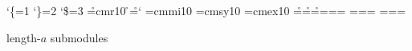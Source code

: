 %
%
%
%
%
%
\catcode`\{=1 \catcode`\}=2 \catcode`\$=3
\font\r=cmr10 \r \hyphenchar\r=`\- \hsize=200pt \parindent=0pt
\font\mi=cmmi10 \font\sy=cmsy10 \font\ex=cmex10
=\r {}=\r {}=\r
{}=\mi {}=\mi {}=\mi
{}=\sy {}=\sy {}=\sy
{}=\ex {}=\ex {}=\ex
{}  

%
%
%
\noindent length-$a$ submodules\showlists
\par

